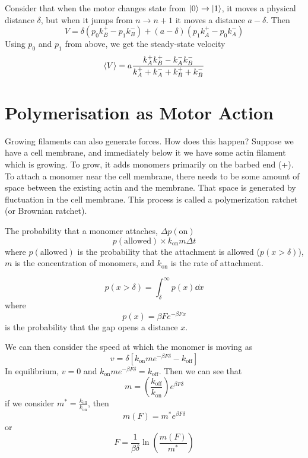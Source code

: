 \documentclass[a4paper,twoside,master.tex]{subfiles}
\begin{document}
Consider that when the motor changes state from $\ket{0} \to\ket{1} $, it moves a physical distance $ \delta $, but when it jumps from $ n \to n + 1 $ it moves a distance $ a - \delta $. Then
\begin{equation}
    V = \delta (p_0 k_B^+ - p_1 k_B^-) + (a - \delta)(p_1 k_A^+ - p_0 k_A^-)
\end{equation}
Using $ p_0 $ and $ p_1 $ from above, we get the steady-state velocity
\begin{equation}
    \ev{V} = a \frac{k_A^+ k_B^+ - k_A^- k_B^-}{k_A^+ + k_A^- + k_B^+ + k_B^-}
\end{equation}

\section{Polymerisation as Motor Action}\label{sec:polymerisation_as_motor_action}

Growing filaments can also generate forces. How does this happen? Suppose we have a cell membrane, and immediately below it we have some actin filament which is growing. To grow, it adds monomers primarily on the barbed end (+). To attach a monomer near the cell membrane, there needs to be some amount of space between the existing actin and the membrane. That space is generated by fluctuation in the cell membrane. This process is called a polymerization ratchet (or Brownian ratchet).

The probability that a monomer attaches, $ \Delta p(\text{on}) $
\begin{equation}
    p(\text{allowed}) \times k_{\text{on}} m \Delta t
\end{equation}
where $ p(\text{allowed}) $ is the probability that the attachment is allowed ($p(x > \delta) $), $ m $ is the concentration of monomers, and $ k_{\text{on}} $ is the rate of attachment.

\begin{equation}
    p(x > \delta) = \int_{\delta}^{\infty} p(x) \dd{x}
\end{equation}
where
\begin{equation}
    p(x) = \beta F e^{- \beta F x}
\end{equation}
is the probability that the gap opens a distance $ x $. 

We can then consider the speed at which the monomer is moving as
\begin{equation}
    v = \delta [k_{\text{on}} m e^{- \beta F \delta} - k_{\text{off}}]
\end{equation}
In equilibrium, $ v = 0 $ and $ k_{\text{on}} m e^{- \beta F \delta} = k_{\text{off}} $. Then we can see that
\begin{equation}
    m = \left( \frac{k_{\text{off}}}{k_{\text{on}}} \right) e^{\beta F \delta}
\end{equation}
if we consider $ m^* = \frac{k_{\text{off}}}{k_{\text{on}}} $, then
\begin{equation}
    m(F) = m^* e^{\beta F \delta}
\end{equation}
or
\begin{equation}
    F = \frac{1}{\beta \delta} \ln(\frac{m(F)}{m^*})
\end{equation}
\end{document}
